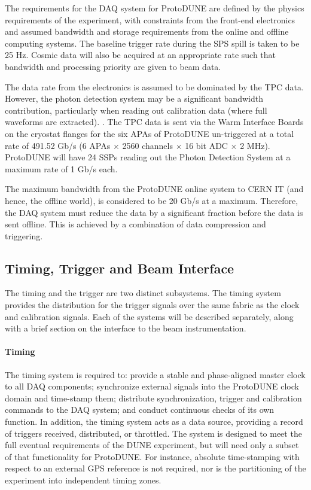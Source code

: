 The requirements for the DAQ system for ProtoDUNE are defined
by the physics requirements of the experiment, with constraints from the
front-end electronics and assumed bandwidth and storage requirements
from the online and offline computing systems.  The baseline trigger
rate during the SPS spill is taken to be 25 Hz.  Cosmic data will also
be acquired at an appropriate rate such that bandwidth and processing priority are given 
to beam data.

The data rate from the electronics is assumed to be dominated by the
TPC data.  However, the photon detection system may be a significant
bandwidth contribution, particularly when reading out calibration data
(where full waveforms are extracted).  .
The TPC data is sent via the Warm Interface Boards on the cryostat flanges
for the six APAs of ProtoDUNE un-triggered at a total rate of 491.52 Gb/s
(6 APAs $\times$ 2560 channels $\times$ 16 bit ADC $\times$ 2 MHz).
ProtoDUNE will have 24 SSPs reading out the Photon Detection System at
a maximum rate of 1 Gb/s each.

The maximum bandwidth from the ProtoDUNE online system to CERN IT (and
hence, the offline world), is considered to be 20 Gb/s at a maximum.
Therefore, the DAQ system must reduce the data by a significant fraction
before the data is sent offline.  This is achieved by a combination of
data compression and triggering.


\subsection{Timing, Trigger and Beam Interface}
\label{sec:daq_time}

The timing and the trigger are two distinct subsystems.  The timing
system provides the distribution for the trigger signals over the same
fabric as the clock and calibration signals.  Each of the systems will
be described separately, along with a brief section on the interface to
the beam instrumentation.

\paragraph{Timing}


The timing system is required to: provide a stable and phase-aligned
master clock to all DAQ components; synchronize external signals into the
ProtoDUNE clock domain and time-stamp them; distribute synchronization,
trigger and calibration commands to the DAQ system; and conduct continuous
checks of its own function. In addition, the timing system acts as a
data source, providing a record of triggers received, distributed, or
throttled. The system is designed to meet the full eventual requirements
of the DUNE experiment, but will need only a subset of that functionality
for ProtoDUNE. For instance, absolute time-stamping with respect to an
external GPS reference is not required, nor is the partitioning of the
experiment into independent timing zones.

